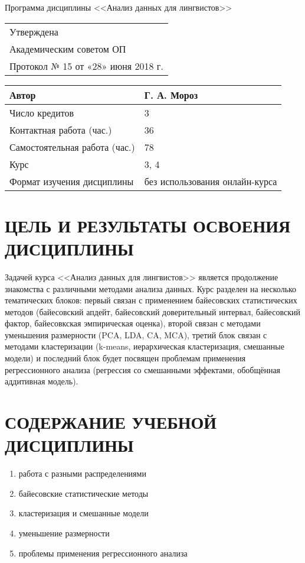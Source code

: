 \documentclass[a4paper]{article}
\begin{document}
\begin{center}
{\Large Программа дисциплины <<Анализ данных для лингвистов>>}
\end{center}
\begin{flushright}
\begin{tabular}{l}
Утверждена                          \\
Академическим советом ОП            \\
Протокол № 15 от  «28» июня 2018 г.
\end{tabular}
\end{flushright}
\begin{tabular}{|l|l|}
\hline
Автор                         & Г. А. Мороз                    \\ \hline
Число кредитов                & 3                              \\ \hline
Контактная работа (час.)      & 36                             \\ \hline
Самостоятельная работа (час.) & 78                             \\ \hline
Курс                          & 3, 4                            \\ \hline
Формат изучения дисциплины    & без использования онлайн-курса \\ \hline
\end{tabular}
\section{ЦЕЛЬ И РЕЗУЛЬТАТЫ ОСВОЕНИЯ ДИСЦИПЛИНЫ}
Задачей курса <<Анализ данных для лингвистов>> является продолжение знакомства с различными методами анализа данных. Курс разделен на несколько тематических блоков: первый связан с применением байесовских статистических методов (байесовский апдейт, байесовский доверительный интервал, байесовский фактор, байесовкская эмпирическая оценка), второй связан с методами уменьшения размерности (PCA, LDA, CA, MCA), третий блок связан с методами кластеризации (k-means, иерархическая кластеризация, смешанные модели) и последний блок будет посвящен проблемам применения регрессионного анализа (регрессия со смешанными эффектами, обобщённая аддитивная модель).
\section{СОДЕРЖАНИЕ УЧЕБНОЙ ДИСЦИПЛИНЫ}
\begin{enumerate}
\item работа с разными распределениями
\item байесовские статистические методы
\item кластеризация и смешанные модели
\item уменьшение размерности
\item проблемы применения регрессионного анализа
\end{enumerate}
\end{document}
